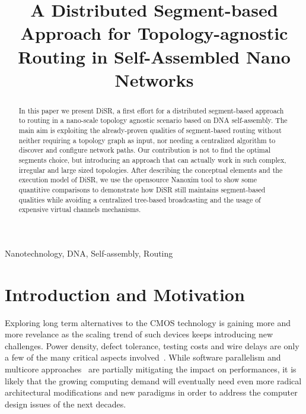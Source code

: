 \documentclass[final,journal,letterpaper]{IEEEtran}
\begin{document}

\title{A Distributed Segment-based Approach for Topology-agnostic
Routing in Self-Assembled Nano Networks} 

\author{
  
  }

\maketitle


\begin{abstract}
In this paper we present DiSR, a first effort for a distributed
segment-based approach to routing in a nano-scale topology agnostic
scenario based on DNA self-assembly. The main aim is exploiting the
already-proven qualities of segment-based routing without neither requiring a
topology graph as input, nor needing a centralized algorithm to
discover and configure network paths. Our contribution is not to find
the optimal segments choice, but introducing an approach that can
actually work in such complex, irregular and large sized topologies.
After describing the conceptual elements and the execution model of DiSR,
we use the opensource Nanoxim tool to show some quantitive
comparisons to demonstrate how DiSR still maintains segment-based
qualities while avoiding a centralized tree-based broadcasting and the
usage of expensive virtual channels mechanisms.
\end{abstract}


\begin{IEEEkeywords}
Nanotechnology, DNA, Self-assembly, Routing
\end{IEEEkeywords}

\section{Introduction and Motivation}
Exploring long term alternatives to the CMOS technology is gaining
more and more revelance as the scaling trend of such devices keeps
introducing new challenges. Power density, defect tolerance, testing
costs and wire delays are only a few of the many critical aspects
involved~\cite{}. While software parallelism and multicore
approaches~\cite{TODO} are partially mitigating the impact on
performances, it is likely that the growing computing demand will
eventually need even more radical architectural modifications and new
paradigms in order to address the computer design issues of the next
decades.
\end{document}
